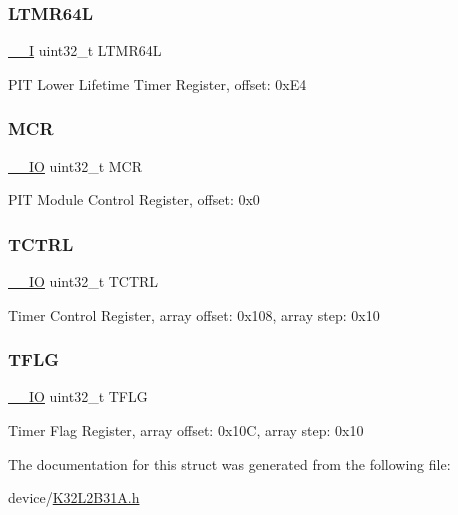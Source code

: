 \subsubsection{\texorpdfstring{LTMR64L}{LTMR64L}}
{\footnotesize\ttfamily \mbox{\hyperlink{core__cm0plus_8h_af63697ed9952cc71e1225efe205f6cd3}{\+\_\+\+\_\+I}} uint32\+\_\+t L\+T\+M\+R64L}

P\+IT Lower Lifetime Timer Register, offset\+: 0x\+E4 \mbox{\label{struct_p_i_t___type_a27af4e9f888f0b7b1e8da7e002d98798}} 
\subsubsection{\texorpdfstring{MCR}{MCR}}
{\footnotesize\ttfamily \mbox{\hyperlink{core__cm0plus_8h_aec43007d9998a0a0e01faede4133d6be}{\+\_\+\+\_\+\+IO}} uint32\+\_\+t M\+CR}

P\+IT Module Control Register, offset\+: 0x0 \mbox{\label{struct_p_i_t___type_ad205d7250cea8af8b177be3e861193d8}} 
\subsubsection{\texorpdfstring{TCTRL}{TCTRL}}
{\footnotesize\ttfamily \mbox{\hyperlink{core__cm0plus_8h_aec43007d9998a0a0e01faede4133d6be}{\+\_\+\+\_\+\+IO}} uint32\+\_\+t T\+C\+T\+RL}

Timer Control Register, array offset\+: 0x108, array step\+: 0x10 \mbox{\label{struct_p_i_t___type_a38fdb1e5ac5dd95a6f67e651ded71276}} 
\subsubsection{\texorpdfstring{TFLG}{TFLG}}
{\footnotesize\ttfamily \mbox{\hyperlink{core__cm0plus_8h_aec43007d9998a0a0e01faede4133d6be}{\+\_\+\+\_\+\+IO}} uint32\+\_\+t T\+F\+LG}

Timer Flag Register, array offset\+: 0x10C, array step\+: 0x10 

The documentation for this struct was generated from the following file\+:\begin{DoxyCompactItemize}
\item 
device/\mbox{\hyperlink{_k32_l2_b31_a_8h}{K32\+L2\+B31\+A.\+h}}\end{DoxyCompactItemize}
